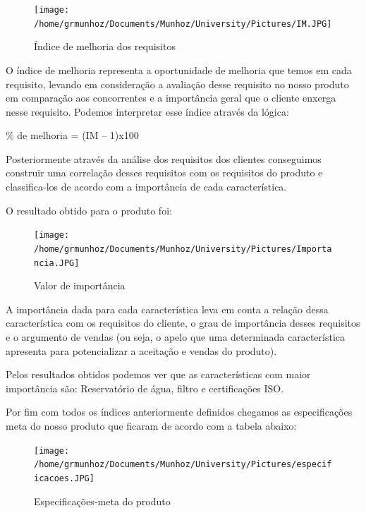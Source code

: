 \documentclass[
	12pt,				%
	openright,			%
	oneside,			%
	a4paper,			%
	english,			%
	french,				%
	spanish,			%
	brazil				%
	]{abntex2}
\begin{document}
\begin{figure}[H]
\begin{center}
\caption{Índice de melhoria dos requisitos}
\texttt{[image: /home/grmunhoz/Documents/Munhoz/University/Pictures/IM.JPG]} 
\end{center}
\end{figure}

O índice de melhoria representa a oportunidade de melhoria que temos em cada requisito, levando em consideração a avaliação desse requisito no nosso produto em comparação aos concorrentes e a importância geral que o cliente enxerga nesse requisito. Podemos interpretar esse índice através da lógica:

\begin{center}
$\%$ de melhoria = (IM – 1)x100
\end{center}

Posteriormente através da análise dos requisitos dos clientes conseguimos construir uma correlação desses requisitos com os requisitos do produto e classifica-los de acordo com a importância de cada característica.

O resultado obtido para o produto foi:

\begin{figure}[H]
\begin{center}
\caption{Valor de importância}
\texttt{[image: /home/grmunhoz/Documents/Munhoz/University/Pictures/Importancia.JPG]} 
\end{center}
\end{figure}

A importância dada para cada característica leva em conta a relação dessa característica com os requisitos do cliente, o grau de importância desses requisitos e o argumento de vendas (ou seja, o apelo que uma determinada característica apresenta para potencializar a aceitação e vendas do produto).

Pelos resultados obtidos podemos ver que as características com maior importância são: Reservatório de água, filtro e certificações ISO.

Por fim com todos os índices anteriormente definidos chegamos as especificações meta do nosso produto que ficaram de acordo com a tabela abaixo:

\begin{figure}[H]
\begin{center}
\caption{Especificações-meta do produto}
\texttt{[image: /home/grmunhoz/Documents/Munhoz/University/Pictures/especificacoes.JPG]} 
\end{center}
\end{figure}
\end{document}
